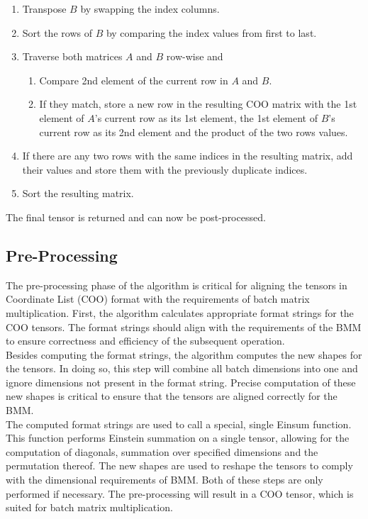 \begin{enumerate}[label*=\arabic*.]
    \item Transpose $B$ by swapping the index columns.
    \item Sort the rows of $B$ by comparing the index values from first to last.
    \item Traverse both matrices $A$ and $B$ row-wise and
          \begin{enumerate}[label*=\arabic*.]
              \item Compare 2nd element of the current row in $A$ and $B$.
              \item If they match, store a new row in the resulting COO matrix with the 1st element of
                    $A$'s current row as its 1st element, the 1st element of $B$'s current row as its
                    2nd element and the product of the two rows values.
          \end{enumerate}
    \item If there are any two rows with the same indices in the resulting matrix, add their values and
          store them with the previously duplicate indices.
    \item Sort the resulting matrix.
\end{enumerate}
The final tensor is returned and can now be post-processed.

\subsection{Pre-Processing}
The pre-processing phase of the algorithm is critical for aligning the tensors in Coordinate List
(COO) format with the requirements of batch matrix multiplication. First, the algorithm calculates
appropriate format strings for the COO tensors. The format strings should align with the requirements
of the BMM to ensure correctness and efficiency of the subsequent operation.\\
Besides computing the format strings, the algorithm computes the new shapes for the tensors.
In doing so, this step will combine all batch dimensions into one and ignore dimensions not present
in the format string. Precise computation of these new shapes is critical to ensure that the tensors
are aligned correctly for the BMM.\\
The computed format strings are used to call a special, single Einsum function. This function performs
Einstein summation on a single tensor, allowing for the computation of diagonals, summation over
specified dimensions and the permutation thereof. The new shapes are used to reshape the tensors to
comply with the dimensional requirements of BMM. Both of these steps are only performed if necessary.
The pre-processing will result in a COO tensor, which is suited for batch matrix multiplication.

